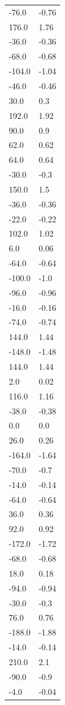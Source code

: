 \begin{longtable}{ll}
-76.0 & -0.76 \\
176.0 & 1.76 \\
-36.0 & -0.36 \\
-68.0 & -0.68 \\
-104.0 & -1.04 \\
-46.0 & -0.46 \\
30.0 & 0.3 \\
192.0 & 1.92 \\
90.0 & 0.9 \\
62.0 & 0.62 \\
64.0 & 0.64 \\
-30.0 & -0.3 \\
150.0 & 1.5 \\
-36.0 & -0.36 \\
-22.0 & -0.22 \\
102.0 & 1.02 \\
6.0 & 0.06 \\
-64.0 & -0.64 \\
-100.0 & -1.0 \\
-96.0 & -0.96 \\
-16.0 & -0.16 \\
-74.0 & -0.74 \\
144.0 & 1.44 \\
-148.0 & -1.48 \\
144.0 & 1.44 \\
2.0 & 0.02 \\
116.0 & 1.16 \\
-38.0 & -0.38 \\
0.0 & 0.0 \\
26.0 & 0.26 \\
-164.0 & -1.64 \\
-70.0 & -0.7 \\
-14.0 & -0.14 \\
-64.0 & -0.64 \\
36.0 & 0.36 \\
92.0 & 0.92 \\
-172.0 & -1.72 \\
-68.0 & -0.68 \\
18.0 & 0.18 \\
-94.0 & -0.94 \\
-30.0 & -0.3 \\
76.0 & 0.76 \\
-188.0 & -1.88 \\
-14.0 & -0.14 \\
210.0 & 2.1 \\
-90.0 & -0.9 \\
-4.0 & -0.04 \\

\end{longtable}
